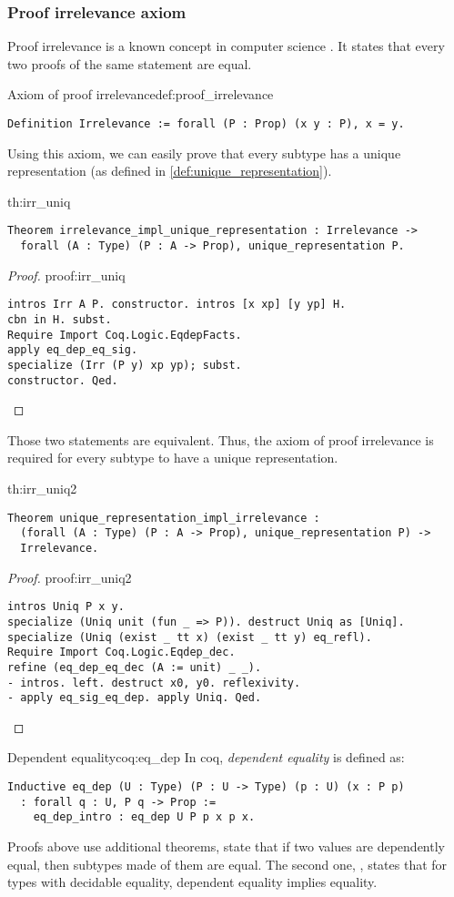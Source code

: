 \subsubsection{Proof irrelevance axiom}
Proof irrelevance is a known concept in computer science \cite{ProofIrrelevance}. It states that every two proofs of the same statement are equal.
\begin{defi}{Axiom of proof irrelevance}{def:proof_irrelevance}
\begin{verbatim}
Definition Irrelevance := forall (P : Prop) (x y : P), x = y.
\end{verbatim}
\end{defi}
Using this axiom, we can easily prove that every subtype has a unique representation (as defined in \ref{def:unique_representation}).
\begin{theo}{}{th:irr_uniq}
    \begin{verbatim}
Theorem irrelevance_impl_unique_representation : Irrelevance -> 
  forall (A : Type) (P : A -> Prop), unique_representation P.
    \end{verbatim}
\end{theo}
\begin{proof}{}{proof:irr_uniq}
    \begin{verbatim}
intros Irr A P. constructor. intros [x xp] [y yp] H.
cbn in H. subst.
Require Import Coq.Logic.EqdepFacts.
apply eq_dep_eq_sig.
specialize (Irr (P y) xp yp); subst.
constructor. Qed.
\end{verbatim}
\end{proof}
Those two statements are equivalent. Thus, the axiom of proof irrelevance is required for every subtype to have a unique representation.
\begin{theo}{}{th:irr_uniq2}
    \begin{verbatim}
Theorem unique_representation_impl_irrelevance : 
  (forall (A : Type) (P : A -> Prop), unique_representation P) -> 
  Irrelevance.
    \end{verbatim}
\end{theo}
\begin{proof}{}{proof:irr_uniq2}
    \begin{verbatim}
intros Uniq P x y.
specialize (Uniq unit (fun _ => P)). destruct Uniq as [Uniq].
specialize (Uniq (exist _ tt x) (exist _ tt y) eq_refl).
Require Import Coq.Logic.Eqdep_dec.
refine (eq_dep_eq_dec (A := unit) _ _).
- intros. left. destruct x0, y0. reflexivity.
- apply eq_sig_eq_dep. apply Uniq. Qed.
\end{verbatim}
\end{proof}
\begin{coq}{Dependent equality}{coq:eq_dep}
In coq, \emph{dependent equality} is defined as:
\begin{verbatim}
Inductive eq_dep (U : Type) (P : U -> Type) (p : U) (x : P p) 
  : forall q : U, P q -> Prop :=
    eq_dep_intro : eq_dep U P p x p x.
\end{verbatim}
Proofs above use additional theorems,  state that if two values are dependently equal, then subtypes made of them are equal. The second one, , states that for types with decidable equality, dependent equality implies equality.
\end{coq}

